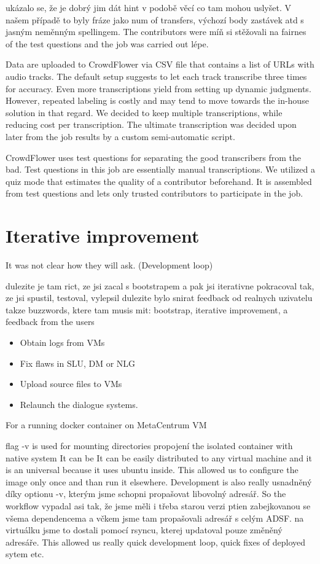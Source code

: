 ukázalo se, že je dobrý jim dát hint v podobě věcí co tam mohou uslyšet. V našem případě to byly fráze jako num of transfers, výchozí body zastávek atd s jasným neměnným spellingem.
The contributors were míň si stěžovali na fairnes of the test questions and the job was carried out lépe.

Data are uploaded to CrowdFlower via CSV file that contains a list of URLs with audio tracks.
The default setup suggests to let each track transcribe three times for accuracy.
Even more transcriptions yield from setting up dynamic judgments.
However, repeated labeling is costly and may tend to move towards the in-house solution in that regard. %
We decided to keep multiple transcriptions, while reducing cost per transcription.
The ultimate transcription was decided upon later from the job results by a custom semi-automatic script.

CrowdFlower uses test questions for separating the good transcribers from the bad.
Test questions in this job are essentially manual transcriptions.
We utilized a quiz mode that estimates the quality of a contributor beforehand.
It is assembled from test questions and lets only trusted contributors to participate in the job.


\section{Iterative improvement}

It was not clear how they will ask.
(Development loop)

dulezite je tam rict, ze jsi zacal s bootstrapem a pak jsi iterativne pokracoval tak, ze jsi spustil, testoval, vylepsil
dulezite bylo snirat feedback od realnych uzivatelu
takze buzzwords, ktere tam musis mit: bootstrap, iterative improvement, a feedback from the users



\begin{itemize}
	\item Obtain logs from VMs
	\item Fix flaws in SLU, DM or NLG
	\item Upload source files to VMs
	\item Relaunch the dialogue systems.
\end{itemize}
For a running docker container on MetaCentrum VM

flag -v is used for mounting directories propojení the isolated container with native system
It can be It can be easily distributed to any virtual machine  and it is an universal because it uses ubuntu inside. This allowed us to configure the image only once and than run it elsewhere. Development is also really usnadněný díky optionu -v, kterým jsme schopni propašovat libovolný adresář. So the workflow vypadal asi tak, že jsme měli i třeba starou verzi ptien zabejkovanou se všema dependencema a včkem jsme tam propašovali adresář s celým ADSF. na virtuálku jsme to dostali pomocí rsyncu, kterej updatoval pouze změněný adresáře. This allowed us really quick development loop, quick fixes of deployed sytem etc.

